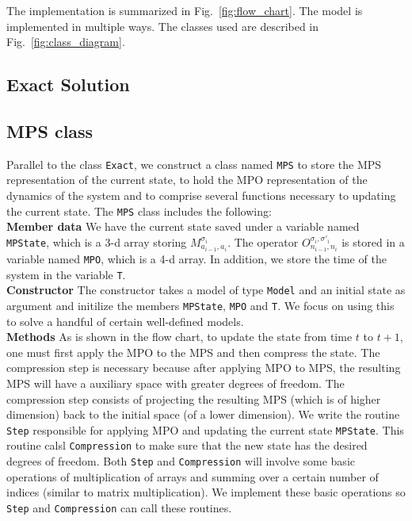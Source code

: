 \documentclass[english]{article}
\begin{document}
The implementation is summarized in Fig.~\ref{fig:flow_chart}. The model is implemented in multiple ways. The classes used are described in Fig.~\ref{fig:class_diagram}.

\subsection{Exact Solution}




\subsection{MPS class}
Parallel to the class \texttt{Exact}, we construct a class named \texttt{MPS} to store the MPS representation of the current state, to hold the MPO representation of the dynamics of the system and to comprise several functions necessary to updating the current state. The \texttt{MPS} class includes the following:
\\[3mm]
\noindent\textbf{Member data} We have the current state saved under a variable named \texttt{MPState}, which is a 3-d array storing $M^{\sigma_i}_{a_{i-1},a_i}$. The operator $O^{\sigma_i, \sigma'_i}_{n_{i-1}, n_i}$ is stored in a variable named \texttt{MPO}, which is a 4-d array. In addition, we store the time of the system in the variable \texttt{T}.
\\[3mm]
\noindent\textbf{Constructor} The constructor takes a model of type \texttt{Model} and an initial state as argument and initilize the members \texttt{MPState}, \texttt{MPO} and \texttt{T}. We  focus on using this to solve a handful of certain well-defined models.
\\[3mm]
\noindent\textbf{Methods} As is shown in the flow chart, to update the state from time $t$ to $t+1$, one must first apply the MPO to the MPS and then compress the state. The compression step is necessary because after applying MPO to MPS, the resulting MPS will have a  auxiliary space with greater degrees of freedom. The compression step consists of projecting the resulting MPS (which is of higher dimension) back to the initial space (of a lower dimension). We write the routine \texttt{Step} responsible for applying MPO and updating the current state \texttt{MPState}. This routine calsl \texttt{Compression} to make sure that the new state has the desired degrees of freedom.
Both \texttt{Step} and \texttt{Compression} will involve some basic operations of multiplication of arrays and summing over a certain number of indices (similar to matrix multiplication). We implement these basic operations so \texttt{Step} and \texttt{Compression} can call these routines.
\end{document}
